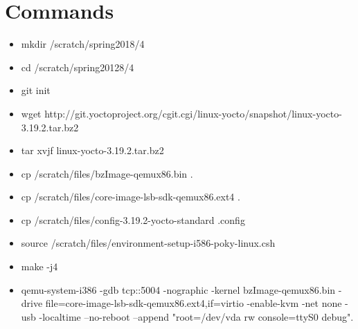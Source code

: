 \section{Commands}
\begin{itemize}
\item mkdir /scratch/spring2018/4
\item cd /scratch/spring20128/4 
\item git init
\item wget http://git.yoctoproject.org/cgit.cgi/linux-yocto/snapshot/linux-yocto-3.19.2.tar.bz2
\item tar xvjf linux-yocto-3.19.2.tar.bz2
\item cp /scratch/files/bzImage-qemux86.bin .
\item cp /scratch/files/core-image-lsb-sdk-qemux86.ext4 .
\item cp /scratch/files/config-3.19.2-yocto-standard .config
\item source /scratch/files/environment-setup-i586-poky-linux.csh
\item make -j4
\item qemu-system-i386 -gdb tcp::5004 -nographic -kernel bzImage-qemux86.bin -drive file=core-image-lsb-sdk-qemux86.ext4,if=virtio -enable-kvm -net none -usb -localtime --no-reboot --append "root=/dev/vda rw console=ttyS0 debug".

\end{itemize}